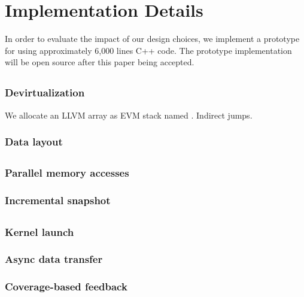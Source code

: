 \section{Implementation Details}

In order to evaluate the impact of our design choices, we implement a prototype for {\tool} using approximately 6,000 lines C++ code.
The prototype implementation will be open source after this paper being accepted.

\subsection{{\translator}}

\subsubsection{Devirtualization}
We allocate an LLVM array as EVM stack named .
Indirect jumps.

\subsubsection{Data layout}

\subsection{{\wrapper}}

\subsubsection{Parallel memory accesses}
 

\subsubsection{Incremental snapshot}

\subsection{{\runner}}

\subsubsection{Kernel launch}


\subsubsection{Async data transfer}

\subsubsection{Coverage-based feedback}
